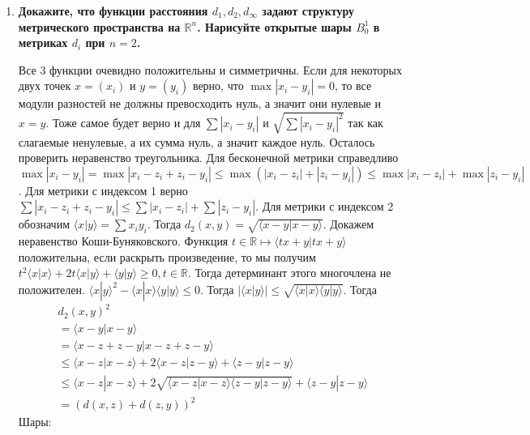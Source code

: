\documentclass{article}
\begin{document}
\begin{enumerate}
    \item \textbf{Докажите, что функции расстояния $d_1,d_2,d_\infty$ задают
        структуру метрического пространства на $\mathbb{R}^n$. Нарисуйте открытые
        шары $B_0^1$ в метриках $d_i$ при $n=2$.}

        Все 3 функции очевидно положительны и симметричны. Если для некоторых
        двух точек $x=(x_i)$ и $y=(y_i)$ верно, что $\max|x_i-y_i|=0$, то все модули
        разностей не должны превосходить нуль, а значит они нулевые и $x=y$.
        Тоже самое будет верно и для $\sum|x_i-y_i|$ и $\sqrt{\sum|x_i-y_i|^2}$
        так как слагаемые ненулевые, а их сумма нуль, а значит каждое нуль.
        Осталось проверить неравенство треугольника. Для бесконечной метрики
        справедливо $\max|x_i-y_i|=\max|x_i-z_i+z_i-y_i|\leqslant\max(|x_i-z_i|
        +|z_i-y_i|)\leqslant\max|x_i-z_i|+\max|z_i-y_i|$. Для метрики с
        индексом 1 верно $\sum|x_i-z_i+z_i-y_i|\leqslant\sum|x_i-z_i|+\sum|z_i-
        y_i|$. Для метрики с индексом 2 обозначим $\langle x|y\rangle=\sum x_i
        y_i$. Тогда $d_2(x,y)=\sqrt{\langle x-y|x-y\rangle}$. Докажем неравенство
        Коши-Буняковского. Функция $t\in\mathbb{R}\mapsto\langle tx+y|tx+y
        \rangle$ положительна, если раскрыть произведение, то мы получим 
        $t^2\langle x|x\rangle+2t\langle x|y\rangle+\langle y|y\rangle\geqslant0
        ,t\in\mathbb{R}$. Тогда детерминант этого многочлена не положителен.
        $\langle x|y\rangle^2-\langle x|x\rangle\langle y|y\rangle \leqslant 0$.
        Тогда $|\langle x|y\rangle|\leqslant\sqrt{\langle x|x\rangle\langle y|y
        \rangle}$.
        Тогда
        \[
            \begin{array}{l}
                d_2(x,y)^2\\
                =\langle x-y|x-y\rangle\\
                =\langle x-z+z-y|x-z+z-y\rangle\\
                \leqslant\langle x-z|x-z\rangle+2\langle x-z|z-y\rangle+\langle z-y|z-y\rangle\\
                \leqslant\langle x-z|x-z\rangle+2\sqrt{\langle x-z|x-z\rangle\langle
                z-y|z-y\rangle}+\langle z-y|z-y\rangle\\
                = (d(x,z)+d(z,y))^2
            \end{array}
        \]
        Шары:

        \begin{center}
\end{center}
\end{enumerate}
\end{document}
